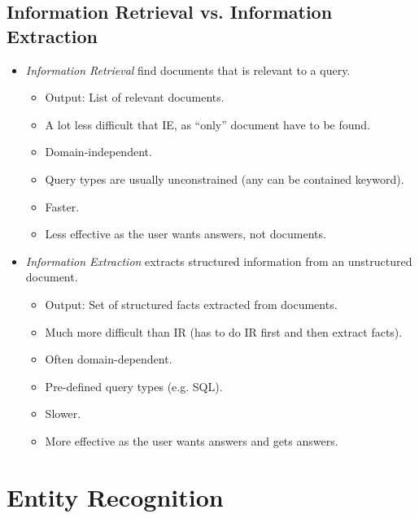\documentclass[a4paper, 11pt, accentcolor = tud3b]{tudreport}
\begin{document}
            \subsection{Information Retrieval vs. Information Extraction} %
                \begin{itemize}
                	\item \textit{Information Retrieval} find documents that is relevant to a query.
                		\begin{itemize}
                			\item Output: List of relevant documents.
                			\item A lot less difficult that IE, as \enquote{only} document have to be found.
                			\item Domain-independent.
                			\item Query types are usually unconstrained (any can be contained keyword).
                			\item Faster.
                			\item Less effective as the user wants answers, not documents.
                		\end{itemize}
                	\item \textit{Information Extraction} extracts structured information from an unstructured document.
                		\begin{itemize}
                			\item Output: Set of structured facts extracted from documents.
                			\item Much more difficult than IR (has to do IR first and then extract facts).
                			\item Often domain-dependent.
                			\item Pre-defined query types (e.g. SQL).
                			\item Slower.
                			\item More effective as the user wants answers and gets answers.
                		\end{itemize}
                \end{itemize}

        \section{Entity Recognition} %
\end{document}
